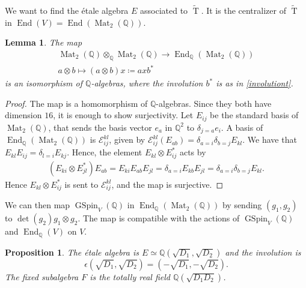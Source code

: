 \documentclass[11pt]{article} %
\newcommand{\8}{\infty}
\newcommand{\GSpin}{\operatorname{GSpin}}
\newcommand{\Ttil}{\widetilde{\operatorname{T}}}
\newcommand{\Q}{\mathbb{Q}}
\newcommand{\End}{\operatorname{End}}
\newcommand{\Ecal}{\mathcal{E}}
\newcommand{\Mat}{\operatorname{Mat}}
\theoremstyle{mytheoremstyle}
\newtheorem{lem}[thm]{Lemma}
\newtheorem{prop}[thm]{Proposition}
\theoremstyle{remark}
\numberwithin{equation}{section}
\begin{document}
\subsubsection{} We want to find the \'etale algebra $E$ associated to $\Ttil$. It is the centralizer of $\Ttil$ in $\End(V)=\End(\Mat_2(\Q))$.
\begin{lem}
    The map
\begin{align}
    \Mat_2(\Q) \otimes_\Q \Mat_2(\Q) \longrightarrow \End_\Q(\Mat_2(\Q)) \nonumber \\
    a \otimes b \longmapsto (a \otimes b)x \coloneqq axb^*
\end{align}
is an isomorphism of $\Q$-algebras, where the involution $b^*$ is as in \eqref{involutiont}.
\end{lem}
\begin{proof} The map is a homomorphism of $\Q$-algebras. Since they both have dimension $16$, it is enough to show surjectivity. Let $E_{ij}$ be the standard basis of $\Mat_2(\Q)$, that sends the basis vector $e_a$ in $\Q^2$ to $\delta_{j=a}e_i$. A basis of $\End_{\Q}(\Mat_2(\Q))$ is $\Ecal_{ij}^{kl}$, given by $\Ecal_{ij}^{kl}(E_{ab})=\delta_{a=i}\delta_{b=j}E_{kl}$. We have that $E_{kl}E_{ij}=\delta_{l=i}E_{kj}$. Hence, the element $E_{kl} \otimes E_{ij}^*$ acts by 
    \begin{align}
        (E_{ki} \otimes E_{jl}^*)E_{ab}=E_{ki} E_{ab} E_{jl} = \delta_{a=i}E_{kb} E_{jl}=\delta_{a=i}\delta_{b=j} E_{kl}.
    \end{align}
    Hence $E_{kl} \otimes E_{ij}^\ast$ is sent to $\Ecal_{ij}^{kl}$, and the map is surjective. 
\end{proof}
We can then map $\GSpin_V(\Q)$ in $\End_\Q(\Mat_2(\Q))$ by sending $(g_1,g_2)$ to $\det(g_2)g_1 \otimes g_2$. The map is compatible with the actions of $\GSpin_V(\Q)$ and $\End_\Q(V)$ on $V$.
\begin{prop} \label{involem}
    The \'etale algebra is $E \simeq \Q(\sqrt{D_1},\sqrt{D_2})$ and the involution is $$\epsilon(\sqrt{D_1},\sqrt{D_2})=(-\sqrt{D_1},-\sqrt{D_2}).$$ The fixed subalgebra $F$ is the totally real field $\Q(\sqrt{D_1D_2})$.
\end{prop}
\end{document}
